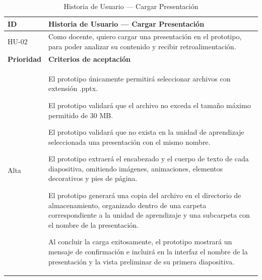 \documentclass[11pt]{article}
\begin{document}
\begin{table}[H]
    \centering
    \renewcommand{\arraystretch}{1.2}
    \begin{tabular}{|p{2.5cm}|p{11cm}|}
        \hline
        \textbf{ID} & \textbf{Historia de Usuario --- Cargar Presentación} \\
        \hline
        HU-02 & Como docente, quiero cargar una presentación en el prototipo, para poder analizar su contenido y recibir retroalimentación. \\
        \hline
        \textbf{Prioridad} & \textbf{Criterios de aceptación} \\
        \hline
        Alta & El prototipo únicamente permitirá seleccionar archivos con extensión .pptx. 
        
        El prototipo validará que el archivo no exceda el tamaño máximo permitido de 30 MB. 
        
        El prototipo validará que no exista en la unidad de aprendizaje seleccionada una presentación con el mismo nombre.
        
        El prototipo extraerá el encabezado y el cuerpo de texto de cada diapositiva, omitiendo imágenes, animaciones, elementos decorativos y pies de página.
        
        El prototipo generará una copia del archivo en el directorio de almacenamiento, organizado dentro de una carpeta correspondiente a la unidad de aprendizaje y una subcarpeta con el nombre de la presentación. 
        
        Al concluir la carga exitosamente, el prototipo mostrará un mensaje de confirmación e incluirá en la interfaz el nombre de la presentación y la vista preliminar de su primera diapositiva. \\
        \hline
    \end{tabular}
    \caption{Historia de Usuario — Cargar Presentación}
    \label{tab:hu-cargar-presentacion}
\end{table}
\end{document}
